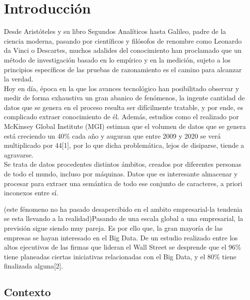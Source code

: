 
\pagestyle{fancy}

\chapter{Introducción}
\label{introduccion}

Desde Aristóteles y su libro Segundos Analíticos hasta Galileo, padre de la ciencia moderna, pasando por científicos y filósofos de renombre como Leonardo da Vinci o Descartes, muchos adalides del conocimiento han proclamado que un método de investigación basado en lo empírico y en la medición, sujeto a los principios específicos de las pruebas de razonamiento es el camino para alcanzar la verdad.\\

Hoy en día, época en la que los avances tecnológico han posibilitado observar y medir de forma exhaustiva un gran abanico de fenómenos, la ingente cantidad de datos que se genera en el proceso resulta ser difícilmente tratable, y por ende, es complicado extraer conocimiento de él. Además, estudios como el realizado por McKinsey Global Institute (MGI) estiman que el volumen de datos que se genera está creciendo un 40\% cada año y auguran  que entre 2009 y 2020 se verá multiplicado por 44[1], por lo que dicha problemática, lejos de disiparse, tiende a agravarse.\\

Se trata de datos procedentes distintos ámbitos, creados por diferentes personas de todo el mundo, incluso por máquinas. Datos que es interesante almacenar y procesar para extraer una semántica de todo ese conjunto de caracteres, a priori inconexos entre sí. 

(este fénomeno no ha pasado desapercibido en el ambito empresarial-la tendenia se esta llevando a la realidad)Pasando de una escala global a una empresarial, la previsión sigue siendo muy pareja. Es por ello que, la gran mayoría de las empresas se hayan interesado en el Big Data. De un estudio realizado entre los altos ejecutivos de las firmas que lideran el Wall Street se desprende que el 96\% tiene planeadas ciertas iniciativas relacionadas con el Big Data, y el 80\% tiene finalizada alguna[2].

\section{Contexto}

